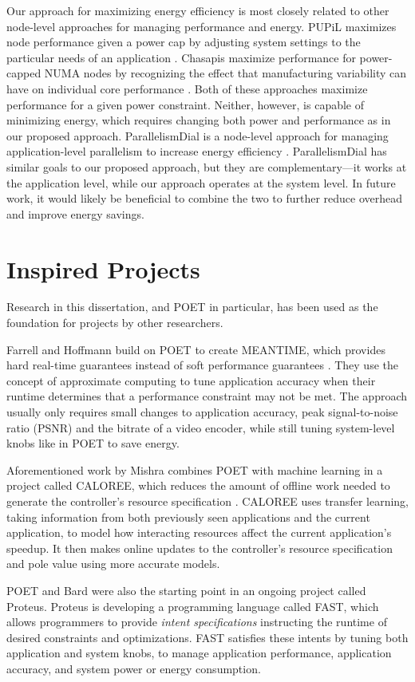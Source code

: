 Our approach for maximizing energy efficiency is most closely related to other node-level approaches for managing performance and energy.
PUPiL maximizes node performance given a power cap by adjusting system settings to the particular needs of an application \cite{pupil}.
Chasapis \etal maximize performance for power-capped NUMA nodes by recognizing the effect that manufacturing variability can have on individual core performance \cite{Chasapis2016}.
Both of these approaches maximize performance for a given power constraint.
Neither, however, is capable of minimizing energy, which requires changing both power and performance as in our proposed approach.
ParallelismDial is a node-level approach for managing application-level parallelism to increase energy efficiency \cite{Sridharan2013}.
ParallelismDial has similar goals to our proposed approach, but they are complementary---it works at the application level, while our approach operates at the system level.
In future work, it would likely be beneficial to combine the two to further reduce overhead and improve energy savings.


\section{Inspired Projects}
\label{sec:related-inspired}

Research in this dissertation, and POET in particular, has been used as the foundation for projects by other researchers.

Farrell and Hoffmann build on POET to create MEANTIME, which provides hard real-time guarantees instead of soft performance guarantees \cite{meantime}.
They use the concept of approximate computing to tune application accuracy when their runtime determines that a performance constraint may not be met.
The approach usually only requires small changes to application accuracy, \eg peak signal-to-noise ratio (PSNR) and the bitrate of a video encoder, while still tuning system-level knobs like in POET to save energy.

Aforementioned work by Mishra \etal combines POET with machine learning in a project called CALOREE, which reduces the amount of offline work needed to generate the controller's resource specification \cite{CALOREE}.
CALOREE uses transfer learning, taking information from both previously seen applications and the current application, to model how interacting resources affect the current application's speedup.
It then makes online updates to the controller's resource specification and pole value using more accurate models.

POET and Bard were also the starting point in an ongoing project called Proteus.
Proteus is developing a programming language called FAST, which allows programmers to provide \emph{intent specifications} instructing the runtime of desired constraints and optimizations.
FAST satisfies these intents by tuning both application and system knobs, \eg to manage application performance, application accuracy, and system power or energy consumption.

